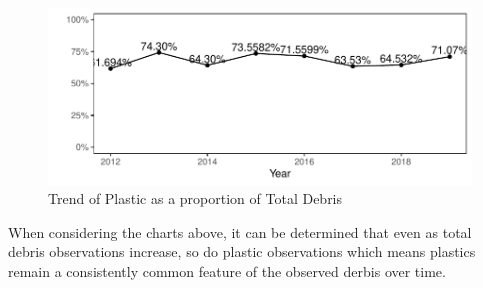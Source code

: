 \documentclass[10pt]{article}\usepackage[]{graphicx}\usepackage[]{color}
\makeatletter
\newenvironment{kframe}{%
 \def\at@end@of@kframe{}%
 \ifinner\ifhmode%
  \def\at@end@of@kframe{\end{minipage}}%
  \begin{minipage}{\columnwidth}%
 \fi\fi%
 \def\FrameCommand##1{\hskip\@totalleftmargin \hskip-\fboxsep
 \colorbox{shadecolor}{##1}\hskip-\fboxsep
     \hskip-\linewidth \hskip-\@totalleftmargin \hskip\columnwidth}%
 \MakeFramed {\advance\hsize-\width
   \@totalleftmargin\z@ \linewidth\hsize
   \@setminipage}}%
 {\par\unskip\endMakeFramed%
 \at@end@of@kframe}
\newenvironment{knitrout}{}{} %
\makeatother
\begin{document}
\begin{figure}[H]
\begin{center}
\begin{knitrout}
\begin{kframe}
\begin{alltt}
\end{alltt}
\end{kframe}
\includegraphics[width=1\linewidth]{figure/unnamed-chunk-24-1} 

\end{knitrout}
\caption {Trend of Plastic as a proportion of Total Debris}
\label{figF}
\end {center}
\end {figure}

When considering the charts above, it can be determined that even as total debris observations increase, so do plastic observations which means plastics remain a consistently common feature of the observed derbis over time.\\
\end{document}
